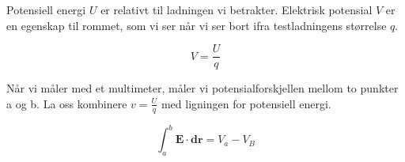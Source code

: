 Potensiell energi $U$ er relativt til ladningen vi betrakter.
Elektrisk potensial $V$ er en egenskap til rommet, som vi ser når vi
ser bort ifra testladningens størrelse $q$.

$$V = \frac{U}{q}$$

Når vi måler med et multimeter, måler vi potensialforskjellen mellom
to punkter a og b.
La oss kombinere $v = \frac{U}{q}$ med ligningen for potensiell energi.

$$\int_a^b \mathbf{E}\cdot\mathbf{dr}
  = V_a - V_B$$

